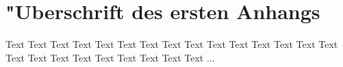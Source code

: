 \chapter[Erster Anhang]{"Uberschrift des ersten Anhangs}\label{app-A}

Text Text Text Text Text Text Text Text Text Text Text Text Text Text Text Text Text Text Text Text Text Text Text Text ...

